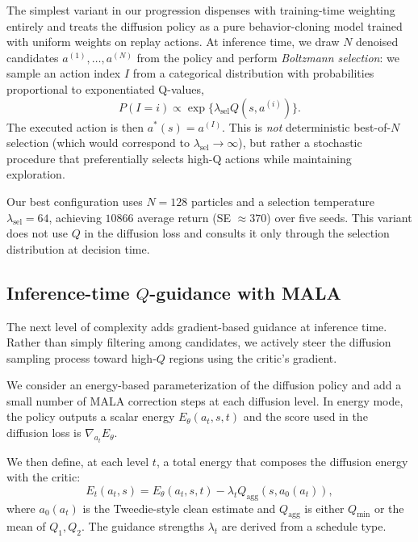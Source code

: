 \documentclass{article}
\theoremstyle{plain}
\theoremstyle{definition}
\theoremstyle{remark}
\begin{document}
The simplest variant in our progression dispenses with training-time weighting entirely and treats the diffusion policy as a pure behavior-cloning model trained with uniform weights on replay actions.
At inference time, we draw $N$ denoised candidates $a^{(1)},\dots,a^{(N)}$ from the policy and perform \emph{Boltzmann selection}: we sample an action index $I$ from a categorical distribution with probabilities proportional to exponentiated Q-values,
\begin{equation}
  P(I = i) \propto \exp\{\lambda_{\text{sel}} Q(s,a^{(i)})\}.
\end{equation}
The executed action is then $a^*(s) = a^{(I)}$.
This is \emph{not} deterministic best-of-$N$ selection (which would correspond to $\lambda_{\text{sel}} \to \infty$), but rather a stochastic procedure that preferentially selects high-Q actions while maintaining exploration.

Our best configuration uses $N=128$ particles and a selection temperature $\lambda_{\text{sel}}=64$, achieving $10866$ average return (SE $\approx 370$) over five seeds.
This variant does not use $Q$ in the diffusion loss and consults it only through the selection distribution at decision time.

\subsection{Inference-time $Q$-guidance with MALA}
\label{sec:mala}

The next level of complexity adds gradient-based guidance at inference time.
Rather than simply filtering among candidates, we actively steer the diffusion sampling process toward high-$Q$ regions using the critic's gradient.

We consider an energy-based parameterization of the diffusion policy and add a small number of MALA correction steps at each diffusion level.
In energy mode, the policy outputs a scalar energy $E_\theta(a_t,s,t)$ and the score used in the diffusion loss is $\nabla_{a_t} E_\theta$.

We then define, at each level $t$, a total energy that composes the diffusion energy with the critic:
\begin{equation}
  E_t(a_t,s) = E_\theta(a_t,s,t) - \lambda_t Q_{\text{agg}}(s,a_0(a_t)),
\end{equation}
where $a_0(a_t)$ is the Tweedie-style clean estimate and $Q_{\text{agg}}$ is either $Q_{\min}$ or the mean of $Q_1,Q_2$.
The guidance strengths $\lambda_t$ are derived from a schedule type.
\end{document}
